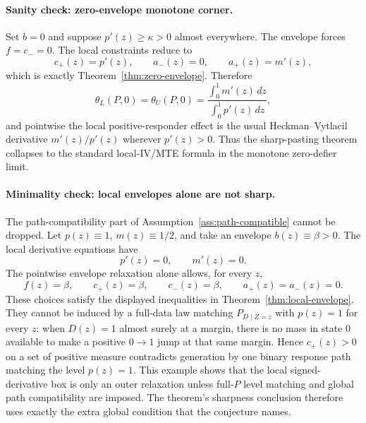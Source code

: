 \paragraph{Sanity check: zero-envelope monotone corner.}
Set \(b=0\) and suppose \(p'(z)\ge\kappa>0\) almost everywhere.  The envelope
forces \(f=c_-=0\).  The local constraints reduce to
\[
c_+(z)=p'(z),\qquad a_-(z)=0,\qquad a_+(z)=m'(z),
\]
which is exactly Theorem~\ref{thm:zero-envelope}.  Therefore
\[
\theta_L(P,0)=\theta_U(P,0)
=
\frac{\int_0^1m'(z)\,dz}{\int_0^1p'(z)\,dz},
\]
and pointwise the local positive-responder effect is the usual
Heckman--Vytlacil derivative \(m'(z)/p'(z)\) wherever \(p'(z)>0\).  Thus the
sharp-pasting theorem collapses to the standard local-IV/MTE formula in the
monotone zero-defier limit.

\paragraph{Minimality check: local envelopes alone are not sharp.}
The path-compatibility part of Assumption~\ref{ass:path-compatible} cannot be
dropped.  Let \(p(z)\equiv1\), \(m(z)\equiv1/2\), and take an envelope
\(b(z)\equiv\beta>0\).  The local derivative equations have
\[
p'(z)=0,\qquad m'(z)=0.
\]
The pointwise envelope relaxation alone allows, for every \(z\),
\[
f(z)=\beta,\qquad c_+(z)=\beta,\qquad c_-(z)=\beta,\qquad
a_+(z)=a_-(z)=0.
\]
These choices satisfy the displayed inequalities in
Theorem~\ref{thm:local-envelope}.  They cannot be induced by a full-data law
matching \(P_{D\mid Z=z}\) with \(p(z)=1\) for every \(z\): when \(D(z)=1\)
almost surely at a margin, there is no mass in state \(0\) available to make a
positive \(0\to1\) jump at that same margin.  Hence \(c_+(z)>0\) on a set of
positive measure contradicts generation by one binary response path matching
the level \(p(z)=1\).  This example shows that the local signed-derivative
box is only an outer relaxation unless full-\(P\) level matching and global
path compatibility are imposed.  The theorem's sharpness conclusion therefore
uses exactly the extra global condition that the conjecture names.
